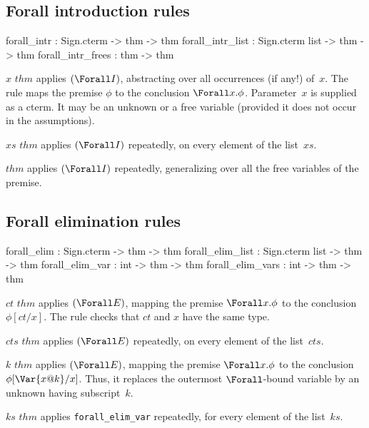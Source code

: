 \subsection{Forall introduction rules}
\begin{ttbox} 
forall_intr       : Sign.cterm      -> thm -> thm
forall_intr_list  : Sign.cterm list -> thm -> thm
forall_intr_frees :                    thm -> thm
\end{ttbox}

\begin{ttdescription}
\item[\ttindexbold{forall_intr} $x$ $thm$] 
applies $({\Forall}I)$, abstracting over all occurrences (if any!) of~$x$.
The rule maps the premise $\phi$ to the conclusion $\Forall x.\phi$.
Parameter~$x$ is supplied as a cterm.  It may be an unknown or a free
variable (provided it does not occur in the assumptions).

\item[\ttindexbold{forall_intr_list} $xs$ $thm$] 
applies $({\Forall}I)$ repeatedly, on every element of the list~$xs$.

\item[\ttindexbold{forall_intr_frees} $thm$] 
applies $({\Forall}I)$ repeatedly, generalizing over all the free variables
of the premise.
\end{ttdescription}


\subsection{Forall elimination rules}
\begin{ttbox} 
forall_elim       : Sign.cterm      -> thm -> thm
forall_elim_list  : Sign.cterm list -> thm -> thm
forall_elim_var   :             int -> thm -> thm
forall_elim_vars  :             int -> thm -> thm
\end{ttbox}

\begin{ttdescription}
\item[\ttindexbold{forall_elim} $ct$ $thm$] 
applies $({\Forall}E)$, mapping the premise $\Forall x.\phi$ to the conclusion
$\phi[ct/x]$.  The rule checks that $ct$ and $x$ have the same type.

\item[\ttindexbold{forall_elim_list} $cts$ $thm$] 
applies $({\Forall}E)$ repeatedly, on every element of the list~$cts$.

\item[\ttindexbold{forall_elim_var} $k$ $thm$] 
applies $({\Forall}E)$, mapping the premise $\Forall x.\phi$ to the conclusion
$\phi[\Var{x@k}/x]$.  Thus, it replaces the outermost $\Forall$-bound
variable by an unknown having subscript~$k$.

\item[\ttindexbold{forall_elim_vars} $ks$ $thm$] 
applies {\tt forall_elim_var} repeatedly, for every element of the list~$ks$.
\end{ttdescription}

